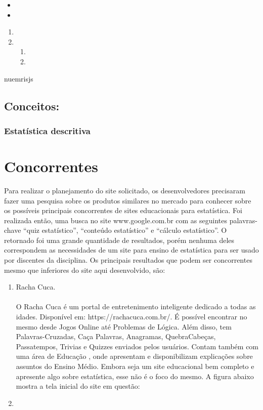 \documentclass[12pt]{article}
\begin{document}
	\begin{itemize}
		\item 
		\item
	\end{itemize}

	\begin{enumerate}
		\item 
		\item
			\begin{enumerate}
				\item
				\item 
			\end{enumerate}
	\end{enumerate}

	\begin{description}
		\item[nuemrisjs]
	\end{description}

	\subsection{Conceitos:}
	
	\subsubsection*{Estatística descritiva}
	\newpage 
	\section{Concorrentes}
	
	Para realizar o planejamento do site solicitado, os desenvolvedores	precisaram fazer uma pesquisa sobre os produtos similares no mercado para conhecer sobre os possíveis principais concorrentes de sites educacionais para estatística. Foi realizada então, uma busca no site www.google.com.br com as seguintes palavras-chave “quiz estatístico”, “conteúdo estatístico” e “cálculo estatístico”. O retornado foi uma grande quantidade de resultados, porém nenhuma deles	correspondem as necessidades de um site para ensino de estatística para	ser usado por discentes da disciplina. Os principais resultados que podem ser concorrentes mesmo que inferiores do site aqui desenvolvido, são:\\

	\begin{enumerate}
		\item Racha Cuca.\\
		\\
	O Racha Cuca é um portal de entretenimento inteligente dedicado a todas as idades. Disponível em: https://rachacuca.com.br/. É possível encontrar no mesmo desde Jogos Online até Problemas de Lógica. Além disso, tem Palavras-Cruzadas, Caça Palavras, Anagramas, QuebraCabeças, Passatempos, Trivias e Quizzes enviados pelos usuários. Contam também com uma área de Educação , onde apresentam e disponibilizam explicações sobre assuntos do Ensino Médio. Embora seja um site educacional bem completo e apresente algo sobre estatística, esse não é o foco do mesmo.
	A figura abaixo mostra a tela inicial do site em questão:
		\item 
	\end{enumerate}
	
	
	 
\end{document}
